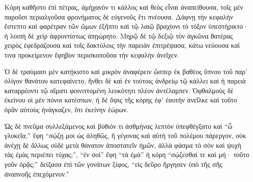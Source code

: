 \begin{greek}
{\large
{ \noindent Κόρη καθῆστο ἐπὶ πέτρας, ἀμήχανόν τι κάλλος καὶ θεὸς εἶναι ἀναπείθουσα, τοῖς μὲν παροῦσι περιαλγοῦσα φρονήματος δὲ εὐγενοῦς ἔτι πνέουσα.  Δάφνῃ τὴν κεφαλὴν ἔστεπτο καὶ φαρέτραν τῶν ὤμων ἐξῆπτο καὶ τῷ λαιῷ βραχίονι τὸ τόξον ὑπεστήρικτο· ἡ λοιπὴ δὲ χεὶρ ἀφροντίστως ἀπῃώρητο. Μηρῷ δὲ τῷ δεξιῷ τὸν ἀγκῶνα θατέρας χειρὸς ἐφεδράζουσα καὶ τοῖς δακτύλοις τὴν παρειὰν ἐπιτρέψασα, κάτω νεύουσα καί τινα προκείμενον ἔφηβον περισκοποῦσα τὴν κεφαλὴν ἀνεῖχεν.  

Ὁ δὲ τραύμασι μὲν κατῄκιστο καὶ μικρὸν ἀναφέρειν ὥσπερ ἐκ βαθέος ὕπνου τοῦ παρ' ὀλίγον θανάτου κατεφαίνετο, ἤνθει δὲ καὶ ἐν τούτοις ἀνδρείῳ τῷ κάλλει καὶ ἡ παρειὰ καταρρέοντι τῷ αἵματι φοινιττομένη λευκότητι πλέον ἀντέλαμπεν. Ὀφθαλμοὺς δὲ ἐκείνου οἱ μὲν πόνοι κατέσπων, ἡ δὲ ὄψις τῆς κόρης ἐφ' ἑαυτὴν ἀνεῖλκε καὶ τοῦτο ὁρᾶν αὐτοὺς ἠνάγκαζεν, ὅτι ἐκείνην ἑώρων.  

Ὡς δὲ πνεῦμα συλλεξάμενος καὶ βύθιόν τι ἀσθμήνας λεπτὸν ὑπεφθέγξατο καὶ ``ὦ γλυκεῖα,'' ἔφη ``σῴζῃ μοι ὡς ἀληθῶς, ἢ γέγονας καὶ αὐτὴ τοῦ πολέμου πάρεργον, οὐκ ἀνέχῃ δὲ ἄλλως οὐδὲ μετὰ θάνατον ἀποστατεῖν ἡμῶν, ἀλλὰ φάσμα τὸ σὸν καὶ ψυχὴ τὰς ἐμὰς περιέπει τύχας;'', ``ἐν σοὶ'' ἔφη ``τὰ ἐμὰ'' ἡ κόρη ``σῴζεσθαί τε καὶ μή· τοῦτο γοῦν ὁρᾷς;'' δείξασα ἐπὶ τῶν γονάτων ξίφος, ``εἰς δεῦρο ἤργησεν ὑπὸ τῆς σῆς ἀναπνοῆς ἐπεχόμενον.''

}
}
\end{greek}

